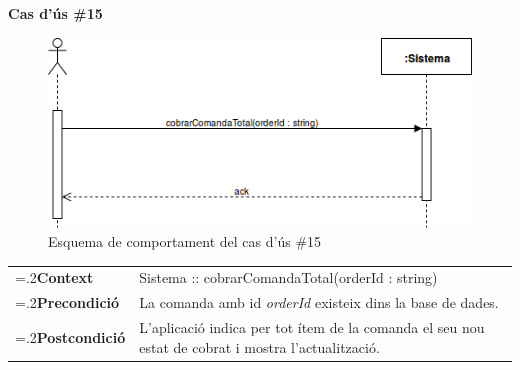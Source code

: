 \clearpage
\noindent\textbf{\large Cas d'ús \#15}\\
\begin{figure}[H]
\centering
\includegraphics[scale=0.6]{Figures/casdus_15.png}
\caption{Esquema de comportament del cas d'ús \#15}
\end{figure}
\begin{table}[h]
\noindent
\begin{tabularx}{\linewidth}{
>{\hsize=.2\hsize}X%
>{\hsize=0.8\hsize}X%
}
\textbf{Context} 		& Sistema :: cobrarComandaTotal(orderId : string) \\
\textbf{Precondició} 	& La comanda amb id \textit{orderId} existeix dins la base de dades. \\
\textbf{Postcondició}	& L'aplicació indica per tot ítem de la comanda el seu nou estat de cobrat i mostra l'actualització. \\
\end{tabularx}
\label{}
\end{table}

